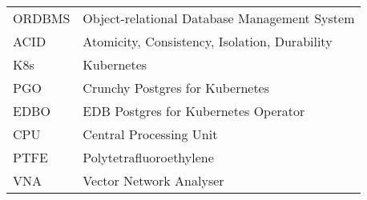 
\seznamzkr

\begin{tabular}{ll}
    ORDBMS & Object-relational Database Management System  \\
    ACID   & Atomicity, Consistency, Isolation, Durability \\
    K8s    & Kubernetes                                    \\
    PGO    & Crunchy Postgres for Kubernetes               \\
    EDBO   & EDB Postgres for Kubernetes Operator          \\
    CPU    & Central Processing Unit                       \\
    PTFE   & Polytetrafluoroethylene                       \\
    VNA    & Vector Network Analyser                       \\
\end{tabular}

